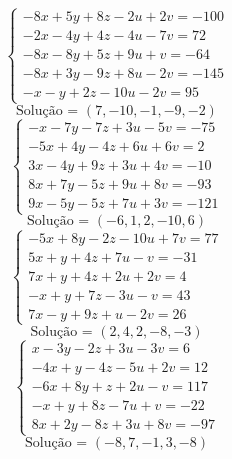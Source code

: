 \documentclass[12pt,oneside,a4paper,fleqn]{article}
\begin{document}
\begin{multicols*}{2}
\begin{equation*}
\begin{cases}
-8x+5y+8z-2u+2v=-100 \\
-2x-4y+4z-4u-7v=72 \\
-8x-8y+5z+9u+v=-64 \\
-8x+3y-9z+8u-2v=-145 \\
-x-y+2z-10u-2v=95
\end{cases}
\end{equation*}
\begin{equation*}
\text{Solução = }\left(7,-10,-1,-9,-2\right)
\end{equation*}
\vspace{\baselineskip}
\begin{equation*}
\begin{cases}
-x-7y-7z+3u-5v=-75 \\
-5x+4y-4z+6u+6v=2 \\
3x-4y+9z+3u+4v=-10 \\
8x+7y-5z+9u+8v=-93 \\
9x-5y-5z+7u+3v=-121
\end{cases}
\end{equation*}
\begin{equation*}
\text{Solução = }\left(-6,1,2,-10,6\right)
\end{equation*}
\vspace{\baselineskip}
\begin{equation*}
\begin{cases}
-5x+8y-2z-10u+7v=77 \\
5x+y+4z+7u-v=-31 \\
7x+y+4z+2u+2v=4 \\
-x+y+7z-3u-v=43 \\
7x-y+9z+u-2v=26
\end{cases}
\end{equation*}
\begin{equation*}
\text{Solução = }\left(2,4,2,-8,-3\right)
\end{equation*}
\vspace{\baselineskip}
\begin{equation*}
\begin{cases}
x-3y-2z+3u-3v=6 \\
-4x+y-4z-5u+2v=12 \\
-6x+8y+z+2u-v=117 \\
-x+y+8z-7u+v=-22 \\
8x+2y-8z+3u+8v=-97
\end{cases}
\end{equation*}
\begin{equation*}
\text{Solução = }\left(-8,7,-1,3,-8\right)
\end{equation*}

\end{multicols*}
\end{document}
